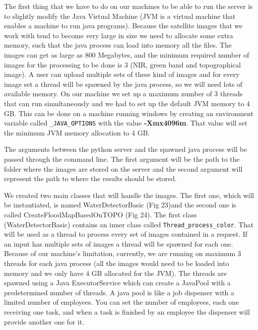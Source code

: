 \documentclass[12pt, a4paper]{report}
\begin{document}
\quad 
The first thing that we have to do on our machines to be able to run the server is to slightly modify the Java Virtual Machine (JVM is a virtual machine that enables a machine to run java programs). Because the satellite images that we work with tend to become very large in size we need to allocate some extra memory, such that the java process can load into memory all the files. The images can get as large as 800 Megabytes, and the minimum required number of images for the processing to be done is 3 (NIR, green band and topographical image). A user can upload multiple sets of these kind of images and for every image set a thread will be spawned by the java process, so we will need lots of available memory. On our machine we set up a maximum number of 3 threads that can run simultaneously and we had to set up the default JVM memory to 4 GB. This can be done on a machine running windows by  creating an environment variable called \texttt{\_JAVA\_OPTIONS} with the value \textbf{-Xmx4096m}. That value will set the minimum JVM memory allocation to 4 GB.
\par 

The arguments between the python server and the spawned java process will be passed through the command line. The first argument will be the path to the folder where the images are stored on the server and the second argument will represent the path to where the results should be stored.
\par 

We created two main classes that will handle the images. The first one, which will be instantiated, is named WaterDetectorBasic (Fig 23)and the second one is called CreateFloodMapBasedOnTOPO (Fig 24). The first class (WaterDetectorBasic) contains an inner class called \texttt{Thread\_process\_color}. That will be used as a thread to process every set of images contained in a request. If an input has multiple sets of images a thread will be spawned for each one. Because of our machine's limitation, currently, we are running on maximum 3 threads for each java process (all the images would need to be loaded into memory and we only have 4 GB allocated for the JVM). The threads are spawned using a Java ExecutorService which can create a JavaPool with a predetermined number of threads. A java pool is like a job dispenser with a limited number of employees. You can set the number of employees, each one receiving one task, and when a task is finished by an employee the dispenser will provide another one for it.
\end{document}
